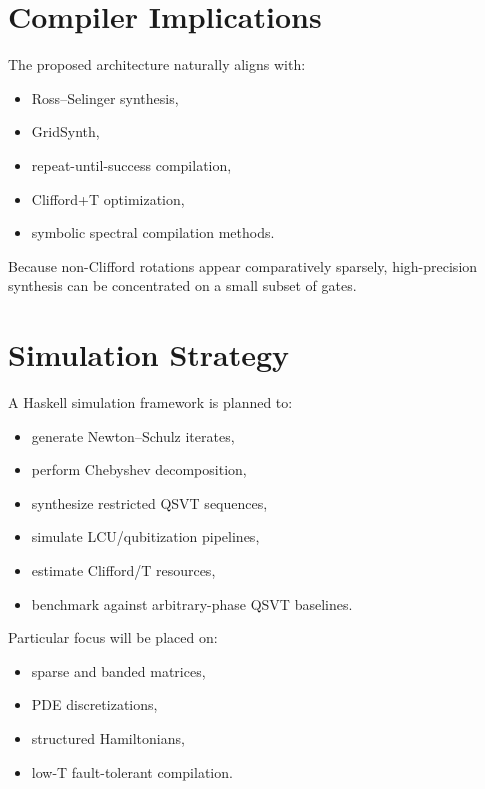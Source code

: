 \documentclass[12pt,a4paper]{article}
\begin{document}

\section{Compiler Implications}

The proposed architecture naturally aligns with:

\begin{itemize}
    \item Ross--Selinger synthesis,
    \item GridSynth,
    \item repeat-until-success compilation,
    \item Clifford+T optimization,
    \item symbolic spectral compilation methods.
\end{itemize}

Because non-Clifford rotations appear comparatively sparsely, high-precision synthesis can be concentrated on a small subset of gates.


\section{Simulation Strategy}

A Haskell simulation framework is planned to:

\begin{itemize}
    \item generate Newton--Schulz iterates,
    \item perform Chebyshev decomposition,
    \item synthesize restricted QSVT sequences,
    \item simulate LCU/qubitization pipelines,
    \item estimate Clifford/T resources,
    \item benchmark against arbitrary-phase QSVT baselines.
\end{itemize}

Particular focus will be placed on:

\begin{itemize}
    \item sparse and banded matrices,
    \item PDE discretizations,
    \item structured Hamiltonians,
    \item low-T fault-tolerant compilation.
\end{itemize}
\end{document}
